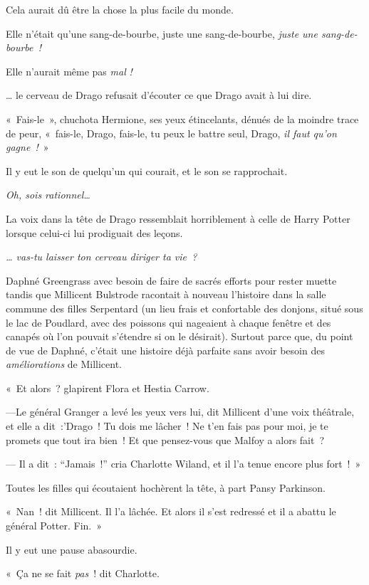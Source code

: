 Cela aurait dû être la chose la plus facile du monde.

Elle n'était qu'une sang-de-bourbe, juste une sang-de-bourbe, \emph{juste une sang-de-bourbe~!}

Elle n'aurait même pas \emph{mal} \emph{!}

… le cerveau de Drago refusait d'écouter ce que Drago avait à lui dire.

«~Fais-le~», chuchota Hermione, ses yeux étincelants, dénués de la moindre trace de peur, «~fais-le, Drago, fais-le, tu peux le battre seul, Drago, \emph{il faut qu'on gagne~!}~»

Il y eut le son de quelqu'un qui courait, et le son se rapprochait.

\emph{Oh, sois rationnel…}

La voix dans la tête de Drago ressemblait horriblement à celle de Harry Potter lorsque celui-ci lui prodiguait des leçons.

\emph{… vas-tu laisser ton cerveau diriger ta vie~?}


Daphné Greengrass avec besoin de faire de sacrés efforts pour rester muette tandis que Millicent Bulstrode racontait à nouveau l'histoire dans la salle commune des filles Serpentard (un lieu frais et confortable des donjons, situé sous le lac de Poudlard, avec des poissons qui nageaient à chaque fenêtre et des canapés où l'on pouvait s'étendre si on le désirait). Surtout parce que, du point de vue de Daphné, c'était une histoire déjà parfaite sans avoir besoin des \emph{améliorations} de Millicent.

«~Et alors~? glapirent Flora et Hestia Carrow.

---Le général Granger a levé les yeux vers lui, dit Millicent d'une voix théâtrale, et elle a dit~:'Drago~! Tu dois me lâcher~! Ne t'en fais pas pour moi, je te promets que tout ira bien~! Et que pensez-vous que Malfoy a alors fait~?

--- Il a dit~: “Jamais~!” cria Charlotte Wiland, et il l'a tenue encore plus fort~!~»

Toutes les filles qui écoutaient hochèrent la tête, à part Pansy Parkinson.

«~Nan~! dit Millicent. Il l'a lâchée. Et alors il s'est redressé et il a abattu le général Potter. Fin.~»

Il y eut une pause abasourdie.

«~Ça ne se fait \emph{pas}~! dit Charlotte.

